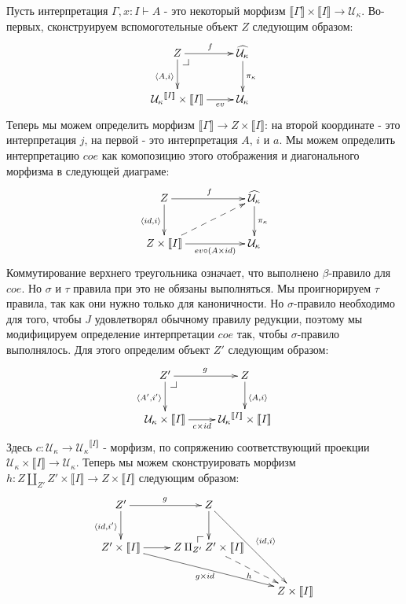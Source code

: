 \documentclass{amsart}
\makeatletter
\theoremstyle{definition}
\theoremstyle{remark}
\renewcommand{\ll}{\llbracket}
\newcommand{\rr}{\rrbracket}
\numberwithin{figure}{section}
\newcommand{\pb}[1][dr]{\save*!/#1-1.2pc/#1:(-1,1)@^{|-}\restore}
\newcommand{\po}[1][dr]{\save*!/#1+1.2pc/#1:(1,-1)@^{|-}\restore}
\makeatother
\begin{document}
\begin{itemize}
Пусть интерпретация $\Gamma, x : I \vdash A$ - это некоторый морфизм $\ll \Gamma \rr \times \ll I \rr \to \mathcal{U}_\kappa$.
Во-первых, сконструируем вспомоготельные объект $Z$ следующим образом:
\[ \xymatrix{ Z \ar[r]^f \ar[d]_{\langle A, i \rangle} \pb                   & \widehat{\mathcal{U}_\kappa} \ar[d]^{\pi_\kappa} \\
              {\mathcal{U}_\kappa}^{\ll I \rr} \times \ll I \rr \ar[r]_-{ev} & \mathcal{U}_\kappa
            }\]
Теперь мы можем определить морфизм $\ll \Gamma \rr \to Z \times \ll I \rr$: на второй координате - это интерпретация $j$, на первой - это интерпретация $A$, $i$ и $a$.
Мы можем определить интерпретацию $coe$ как комопозицию этого отображения и диагонального морфизма в следующей диаграме:
\[ \xymatrix{ Z \ar[rr]^f \ar[d]_{\langle id, i \rangle}                          & & \widehat{\mathcal{U}_\kappa} \ar[d]^{\pi_\kappa} \\
              Z \times \ll I \rr \ar[rr]_-{ev \circ (A \times id)} \ar@{-->}[urr] & & \mathcal{U}_\kappa
            }\]
Коммутирование верхнего треугольника означает, что выполнено $\beta$-правило для $coe$.
Но $\sigma$ и $\tau$ правила при это не обязаны выполняться.
Мы проигнорируем $\tau$ правила, так как они нужно только для каноничности.
Но $\sigma$-правило необходимо для того, чтобы $J$ удовлетворял обычному правилу редукции, поэтому мы модифицируем определение интерпретации $coe$ так, чтобы $\sigma$-правило выполнялось.
Для этого определим объект $Z'$ следующим образом:
\[ \xymatrix{ Z' \ar[r]^g \ar[d]_{\langle A', i' \rangle} \pb           & Z \ar[d]^{\langle A, i \rangle} \\
              \mathcal{U}_\kappa \times \ll I \rr \ar[r]_-{c \times id} & {\mathcal{U}_\kappa}^{\ll I \rr} \times \ll I \rr
            }\]
Здесь $c : \mathcal{U}_\kappa \to {\mathcal{U}_\kappa}^{\ll I \rr}$ - морфизм, по сопряжению соответствующий проекции $\mathcal{U}_\kappa \times \ll I \rr \to \mathcal{U}_\kappa$.
Теперь мы можем сконструировать морфизм $h : Z \amalg_{Z'} Z' \times \ll I \rr \to Z \times \ll I \rr$ следующим образом:
\[ \xymatrix{ Z' \ar[r]^g \ar[d]_{\langle id, i' \rangle}       & Z \ar[d] \ar[rdd]^{\langle id, i \rangle}             & \\
              Z' \times \ll I \rr \ar[r] \ar[rrd]_{g \times id} & \po Z \amalg_{Z'} Z' \times \ll I \rr \ar@{-->}[rd]_h & \\
                                                                &                                                       & Z \times \ll I \rr
            }\]

\end{itemize}
\end{document}

